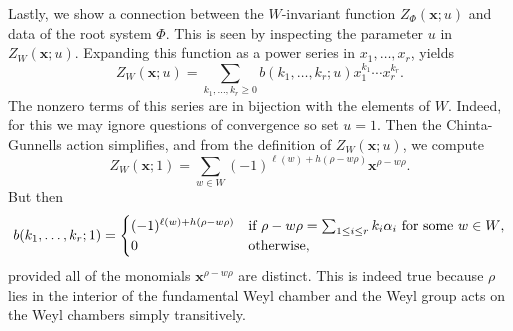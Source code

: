 \documentclass[12pt,reqno,oneside]{amsart}
\begin{document}
    Lastly, we show a connection between the $W$-invariant function $Z_{\Phi}(\mathbf{x};u)$ and data of the root system $\Phi$. This is seen by inspecting the parameter $u$ in $Z_{W}(\mathbf{x};u)$. Expanding this function as a power series in $x_{1},\ldots,x_{r}$, yields
    \[
        Z_{W}(\mathbf{x};u) = \sum_{k_{1},\ldots,k_{r} \ge 0}b(k_{1},\ldots,k_{r};u)x_{1}^{k_{1}} \cdots x_{r}^{k_{r}}.
    \]
    The nonzero terms of this series are in bijection with the elements of $W$. Indeed, for this we may ignore questions of convergence so set $u = 1$. Then the Chinta-Gunnells action simplifies, and from the definition of $Z_{W}(\mathbf{x};u)$, we compute
    \[
        Z_{W}(\mathbf{x};1) = \sum_{w \in W}(-1)^{\ell(w)+h(\rho-w\rho)}\mathbf{x}^{\rho-w\rho}.
    \]
    But then
    \[
        b(k_{1},\ldots,k_{r};1) = \begin{cases} (-1)^{\ell(w)+h(\rho-w\rho)} & \text{if $\rho-w\rho = \sum_{1 \le i \le r}k_{i}\alpha_{i}$ for some $w \in W$}, \\ 0 & \text{otherwise}, \end{cases}
    \]
    provided all of the monomials $\mathbf{x}^{\rho-w\rho}$ are distinct. This is indeed true because $\rho$ lies in the interior of the fundamental Weyl chamber and the Weyl group acts on the Weyl chambers simply transitively.
\end{document}
